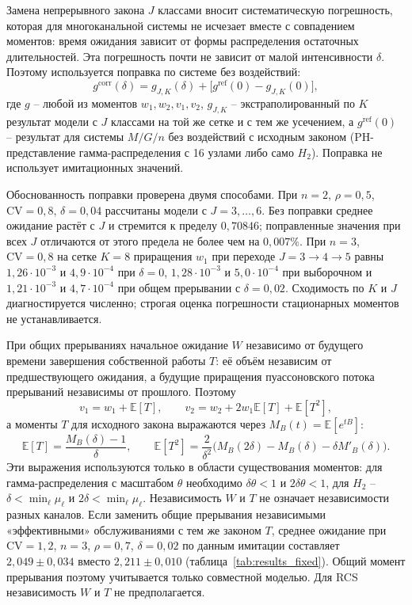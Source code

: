 Замена непрерывного закона \(J\) классами вносит систематическую погрешность, которая для многоканальной системы не исчезает вместе с совпадением моментов: время ожидания зависит от формы распределения остаточных длительностей. Эта погрешность почти не зависит от малой интенсивности \(\delta\). Поэтому используется поправка по системе без воздействий:
\[
g^{\mathrm{corr}}(\delta)=g_{J,K}(\delta)+\bigl[g^{\mathrm{ref}}(0)-g_{J,K}(0)\bigr],
\]
где \(g\) -- любой из моментов \(w_1,w_2,v_1,v_2\), \(g_{J,K}\) -- экстраполированный по \(K\) результат модели с \(J\) классами на той же сетке и с тем же усечением, а \(g^{\mathrm{ref}}(0)\) -- результат для системы \(M/G/n\) без воздействий с исходным законом (PH-представление гамма-распределения с 16 узлами либо само \(H_2\)). Поправка не использует имитационных значений.

Обоснованность поправки проверена двумя способами. При \(n=2\), \(\rho=0{,}5\), \(\mathrm{CV}=0{,}8\), \(\delta=0{,}04\) рассчитаны модели с \(J=3,\ldots,6\). Без поправки среднее ожидание растёт с \(J\) и стремится к пределу \(0{,}70846\); поправленные значения при всех \(J\) отличаются от этого предела не более чем на \(0{,}007\%\). При \(n=3\), \(\mathrm{CV}=0{,}8\) на сетке \(K=8\) приращения \(w_1\) при переходе \(J=3\to4\to5\) равны \(1{,}26\cdot10^{-3}\) и \(4{,}9\cdot10^{-4}\) при \(\delta=0\), \(1{,}28\cdot10^{-3}\) и \(5{,}0\cdot10^{-4}\) при выборочном и \(1{,}21\cdot10^{-3}\) и \(4{,}7\cdot10^{-4}\) при общем прерывании с \(\delta=0{,}02\). Сходимость по \(K\) и \(J\) диагностируется численно; строгая оценка погрешности стационарных моментов не устанавливается.

При общих прерываниях начальное ожидание \(W\) независимо от будущего времени завершения собственной работы \(T\): её объём независим от предшествующего ожидания, а будущие приращения пуассоновского потока прерываний независимы от прошлого. Поэтому
\[
v_1=w_1+\mathbb E[T],\qquad
v_2=w_2+2w_1\mathbb E[T]+\mathbb E[T^2],
\]
а моменты \(T\) для исходного закона выражаются через \(M_B(t)=\mathbb E[e^{tB}]\):
\[
\mathbb E[T]=\frac{M_B(\delta)-1}{\delta},\qquad
\mathbb E[T^2]=\frac{2}{\delta^2}\bigl(M_B(2\delta)-M_B(\delta)-\delta M'_B(\delta)\bigr).
\]
Эти выражения используются только в области существования моментов: для гамма-распределения с масштабом \(\theta\) необходимо \(\delta\theta<1\) и \(2\delta\theta<1\), для \(H_2\) -- \(\delta<\min_\ell\mu_\ell\) и \(2\delta<\min_\ell\mu_\ell\). Независимость \(W\) и \(T\) не означает независимости разных каналов. Если заменить общие прерывания независимыми «эффективными» обслуживаниями с тем же законом \(T\), среднее ожидание при \(\mathrm{CV}=1{,}2\), \(n=3\), \(\rho=0{,}7\), \(\delta=0{,}02\) по данным имитации составляет \(2{,}049\pm0{,}034\) вместо \(2{,}211\pm0{,}010\) (таблица~\ref{tab:results_fixed}). Общий момент прерывания поэтому учитывается только совместной моделью. Для RCS независимость \(W\) и \(T\) не предполагается.

